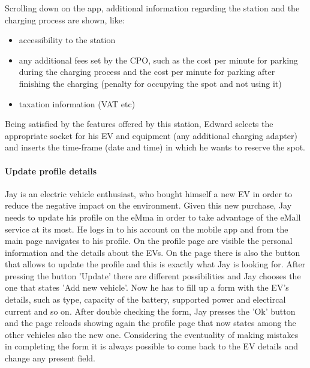 Scrolling down on the app, additional information regarding the station and the charging process are shown, like:
\begin{itemize}
    \item accessibility to the station
    \item any additional fees set by the CPO, such as the cost per minute for parking during the charging process and the cost per minute for parking after finishing the charging (penalty for occupying the spot and not using it)
    \item taxation information (VAT etc)
\end{itemize}
Being satisfied by the features offered by this station, Edward selects the appropriate socket for his EV and equipment (any additional charging adapter) and inserts the time-frame (date and time) in which he wants to reserve the spot.


\paragraph{Update profile details}
Jay is an electric vehicle enthusiast, who bought himself a new EV in order to reduce the negative impact on the environment. Given this new purchase, Jay needs to update his profile on the eMma in order to take advantage of the eMall service at its most. He logs in to his account on the mobile app and from the main page navigates to his profile. On the profile page are visible the personal information and the details about the EVs. On the page there is also the button that allows to update the profile and this is exactly what Jay is looking for. After pressing the button 'Update' there are different possibilities and Jay chooses the one that states 'Add new vehicle'. Now he has to fill up a form with the EV's details, such as type, capacity of the battery, supported power and electircal current and so on. After double checking the form, Jay presses the 'Ok' button and the page reloads showing again the profile page that now states among the other vehicles also the new one. Considering the eventuality of making mistakes in completing the form it is always possible to come back to the EV details and change any present field.

